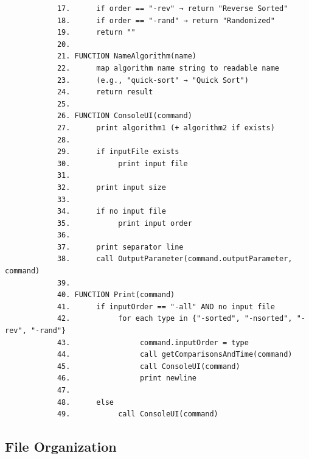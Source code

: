 \begin{itemize}
\begin{itemize}
\begin{verbatim}
            17.      if order == "-rev" → return "Reverse Sorted"
            18.      if order == "-rand" → return "Randomized"
            19.      return ""
            20.
            21. FUNCTION NameAlgorithm(name)
            22.      map algorithm name string to readable name
            23.      (e.g., "quick-sort" → "Quick Sort")
            24.      return result
            25.
            26. FUNCTION ConsoleUI(command)
            27.      print algorithm1 (+ algorithm2 if exists)
            28.
            29.      if inputFile exists
            30.           print input file
            31.
            32.      print input size
            33.
            34.      if no input file
            35.           print input order
            36.
            37.      print separator line
            38.      call OutputParameter(command.outputParameter, command)
            39.
            40. FUNCTION Print(command)
            41.      if inputOrder == "-all" AND no input file
            42.           for each type in {"-sorted", "-nsorted", "-rev", "-rand"}
            43.                command.inputOrder = type
            44.                call getComparisonsAndTime(command)
            45.                call ConsoleUI(command)
            46.                print newline
            47.
            48.      else
            49.           call ConsoleUI(command)
        \end{verbatim}
    \end{itemize}
\end{itemize}

\subsection{File Organization}

